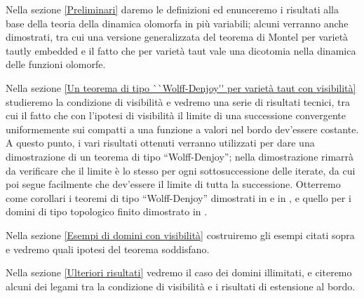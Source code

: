 Nella sezione \ref{Preliminari} daremo le definizioni ed enunceremo i risultati alla base della teoria della dinamica olomorfa in più variabili; alcuni verranno anche dimostrati, tra cui una versione generalizzata del teorema di Montel per varietà tautly embedded e il fatto che per varietà taut vale una dicotomia nella dinamica delle funzioni olomorfe.

Nella sezione \ref{Un teorema di tipo ``Wolff-Denjoy'' per varietà taut con visibilità} studieremo la condizione di visibilità e vedremo una serie di risultati tecnici, tra cui il fatto che con l'ipotesi di visibilità il limite di una successione convergente uniformemente sui compatti a una funzione a valori nel bordo dev'essere costante. A questo punto, i vari risultati ottenuti verranno utilizzati per dare una dimostrazione di un teorema di tipo ``Wolff-Denjoy''; nella dimostrazione rimarrà da verificare che il limite è lo stesso per ogni sottosuccessione delle iterate, da cui poi segue facilmente che dev'essere il limite di tutta la successione. Otterremo come corollari i teoremi di tipo ``Wolff-Denjoy'' dimostrati in \cite{A3} e in \cite{CMS}, e quello per i domini di tipo topologico finito dimostrato in \cite{BM}.

Nella sezione \ref{Esempi di domini con visibilità} costruiremo gli esempi citati sopra e vedremo quali ipotesi del teorema soddisfano.

Nella sezione \ref{Ulteriori risultati} vedremo il caso dei domini illimitati, e citeremo alcuni dei legami tra la condizione di visibilità e i risultati di estensione al bordo.